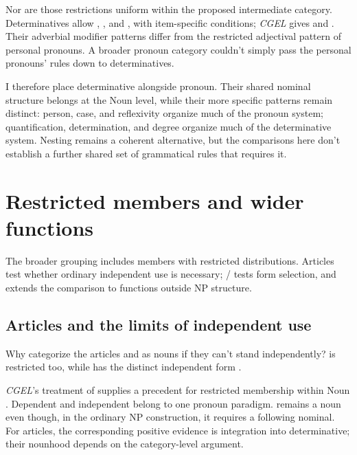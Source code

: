 \documentclass[12pt]{article}
\begin{document}
Nor are those restrictions uniform within the proposed intermediate category. Determinatives allow , , and , with item-specific conditions; \textit{CGEL} gives  and  \citep[415--416]{huddleston2002}. Their adverbial modifier patterns differ from the restricted adjectival pattern of personal pronouns. A broader pronoun category couldn't simply pass the personal pronouns' rules down to determinatives.

I therefore place determinative alongside pronoun. Their shared nominal structure belongs at the Noun level, while their more specific patterns remain distinct: person, case, and reflexivity organize much of the pronoun system; quantification, determination, and degree organize much of the determinative system. Nesting remains a coherent alternative, but the comparisons here don't establish a further shared set of grammatical rules that requires it.

\section{Restricted members and wider functions}\label{sec:articles}

The broader grouping includes members with restricted distributions. Articles test whether ordinary independent use is necessary; / tests form selection, and  extends the comparison to functions outside NP structure.

\subsection{Articles and the limits of independent use}

Why categorize the articles  and  as nouns if they can't stand independently?  is restricted too, while  has the distinct independent form  \citep[371--372, 410--411]{huddleston2002}.

\textit{CGEL}'s treatment of  supplies a precedent for restricted membership within Noun \citep[470--471]{huddleston2002}. Dependent  and independent  belong to one pronoun paradigm.  remains a noun even though, in the ordinary NP construction, it requires a following nominal. For articles, the corresponding positive evidence is integration into determinative; their nounhood depends on the category-level argument.
\end{document}
